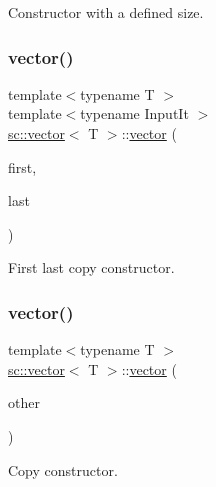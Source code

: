 Constructor with a defined size. 

\mbox{\label{classsc_1_1vector_ab58c55200c6a120b9d24793a271512fb}} 
\subsubsection{\texorpdfstring{vector()}{vector()}\hspace{0.1cm}{\footnotesize\ttfamily [3/5]}}
{\footnotesize\ttfamily template$<$typename T $>$ \\
template$<$typename Input\+It $>$ \\
\hyperlink{classsc_1_1vector}{sc\+::vector}$<$ T $>$\+::\hyperlink{classsc_1_1vector}{vector} (\begin{DoxyParamCaption}\item[{Input\+It}]{first,  }\item[{Input\+It}]{last }\end{DoxyParamCaption})\hspace{0.3cm}{\ttfamily [inline]}}



First last copy constructor. 

\mbox{\label{classsc_1_1vector_abfaa009f13bf79958138f4172ab069bf}} 
\subsubsection{\texorpdfstring{vector()}{vector()}\hspace{0.1cm}{\footnotesize\ttfamily [4/5]}}
{\footnotesize\ttfamily template$<$typename T $>$ \\
\hyperlink{classsc_1_1vector}{sc\+::vector}$<$ T $>$\+::\hyperlink{classsc_1_1vector}{vector} (\begin{DoxyParamCaption}\item[{\hyperlink{classsc_1_1vector}{vector}$<$ T $>$ \&}]{other }\end{DoxyParamCaption})\hspace{0.3cm}{\ttfamily [inline]}}



Copy constructor. 

\mbox{\label{classsc_1_1vector_a431bb1411ec9a488b68b0eed9d8b5727}} 

